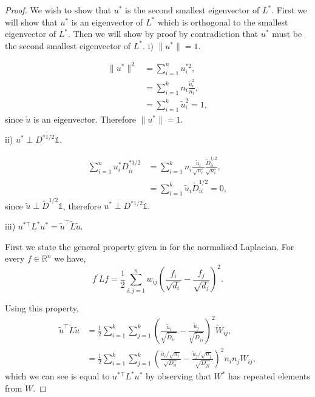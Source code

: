 \begin{proof}
We wish to show that $u^*$ is the second smallest eigenvector of $L^*$.  First we will show that $u^*$ is an eigenvector of $L^*$ which is orthogonal to the smallest eigenvector of $L^*$. Then we will show by proof by contradiction that $u^*$ must be the second smallest eigenvector of $L^*$. 
\newpage
i) $ \|u^*\| = 1. $

\begin{align*}
 \|u^*\|^2 &= \sum_{i=1}^{n}u^{* 2}_i, \\
&= \sum_{i = 1}^{k}n_i \frac{\tilde{u}_i^2}{n_i}, \\
&= \sum_{i=1}^{k}\tilde{u}_i^2 = 1, 
\end{align*}
since $\tilde{u}$ is an eigenvector. Therefore $\|u^*\| = 1$. 

ii)  $u^* \perp D^{* 1/2} \mathds{1}$.

\begin{align*}
 \sum_{i=1}^nu^*_i D_{ii}^{* 1/2} &= \sum_{i=1}^k n_i \frac{\tilde{u}_i}{\sqrt{n_i}} \frac{\tilde{D}^{1/2}_{ii}}{\sqrt{n_i}}, \\
&= \sum_{i=1}^k \tilde{u}_i \tilde{D}^{1/2}_{ii} = 0,
\end{align*}
\noindent since $\tilde{u} \perp \tilde{D}^{1/2} \mathds{1}$, therefore $u^* \perp D^{* 1/2} \mathds{1}.$ 

iii) $u^{*\top} L^* u^* = \tilde{u}^{\top} \tilde{L} \tilde{u}.$

\noindent First we state the general property given in \cite{Luxburg2008} for the normalised Laplacian. For every $f \in  \mathbb{R}^n$ we have,
\begin{equation}
  \label{eq:luxburg_vectors}
  f^{\prime}  L f = \frac{1}{2} \sum_{i,j=1}^n w_{ij} \left( \frac{f_i}{\sqrt{d_i}} - \frac{f_j}{\sqrt{d_j}}  \right)^2.
\end{equation}

\noindent Using this property, 
\begin{align*}
  \tilde{u}^{\top} \tilde{L} \tilde{u} &= \frac{1}{2} \sum_{i = 1}^k \sum_{j = 1}^k \left( \frac{\tilde{u}_i}{\sqrt{\tilde{D}_{ii \phantom{j}}}} - \frac{\tilde{u}_j}{\sqrt{\tilde{D}_{jj}}}  \right)^2 \tilde{W}_{ij}, \\
 &= \frac{1}{2} \sum_{i = 1}^k \sum_{j = 1}^k \left( \frac{\tilde{u}_i / \sqrt{n_i}}{\sqrt{D_{ii}}} - \frac{\tilde{u}_j / \sqrt{n_j}}{\sqrt{D_{jj}}} \right)^2 n_i n_j  W_{ij},
\end{align*}
which we can see is equal to $ u^{* \top}L^*u^*$ by observing that $W^*$ has repeated elements from $W$.



\end{proof}
